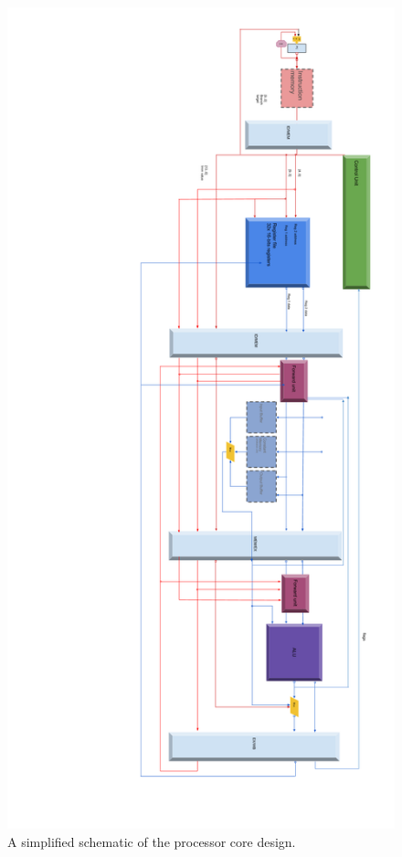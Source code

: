 \begin{figure}[H]
	\centering
	\includegraphics[width=0.8\linewidth]{figures/fpga/core_schematic}
	\caption{A simplified schematic of the processor core design.}
	\label{fig:core_schematic}
\end{figure}
